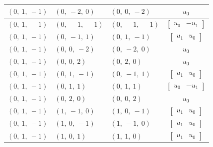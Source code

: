 \documentclass[11pt]{article}
\theoremstyle{definition}
\begin{document}
\begin{longtable}{|l|l|l|c|}
    \hline
    $\left( 0, \  1, \  -1\right)$ & $\left( 0, \  -2, \  0\right)$ & $\left( 0, \  0, \  -2\right)$ & $u_{0}$ \\
    \hline
    $\left( 0, \  1, \  -1\right)$ & $\left( 0, \  -1, \  -1\right)$ & $\left( 0, \  -1, \  -1\right)$ & $\left[\begin{matrix}u_{0} & - u_{1}\end{matrix}\right]$ \\
    \hline
    $\left( 0, \  1, \  -1\right)$ & $\left( 0, \  -1, \  1\right)$ & $\left( 0, \  1, \  -1\right)$ & $\left[\begin{matrix}u_{1} & u_{0}\end{matrix}\right]$ \\
    \hline
    $\left( 0, \  1, \  -1\right)$ & $\left( 0, \  0, \  -2\right)$ & $\left( 0, \  -2, \  0\right)$ & $u_{0}$ \\
    \hline
    $\left( 0, \  1, \  -1\right)$ & $\left( 0, \  0, \  2\right)$ & $\left( 0, \  2, \  0\right)$ & $u_{0}$ \\
    \hline
    $\left( 0, \  1, \  -1\right)$ & $\left( 0, \  1, \  -1\right)$ & $\left( 0, \  -1, \  1\right)$ & $\left[\begin{matrix}u_{1} & u_{0}\end{matrix}\right]$ \\
    \hline
    $\left( 0, \  1, \  -1\right)$ & $\left( 0, \  1, \  1\right)$ & $\left( 0, \  1, \  1\right)$ & $\left[\begin{matrix}u_{0} & - u_{1}\end{matrix}\right]$ \\
    \hline
    $\left( 0, \  1, \  -1\right)$ & $\left( 0, \  2, \  0\right)$ & $\left( 0, \  0, \  2\right)$ & $u_{0}$ \\
    \hline
    $\left( 0, \  1, \  -1\right)$ & $\left( 1, \  -1, \  0\right)$ & $\left( 1, \  0, \  -1\right)$ & $\left[\begin{matrix}u_{1} & u_{0}\end{matrix}\right]$ \\
    \hline
    $\left( 0, \  1, \  -1\right)$ & $\left( 1, \  0, \  -1\right)$ & $\left( 1, \  -1, \  0\right)$ & $\left[\begin{matrix}u_{1} & u_{0}\end{matrix}\right]$ \\
    \hline
    $\left( 0, \  1, \  -1\right)$ & $\left( 1, \  0, \  1\right)$ & $\left( 1, \  1, \  0\right)$ & $\left[\begin{matrix}u_{1} & u_{0}\end{matrix}\right]$ \\

\end{longtable}
\end{document}

